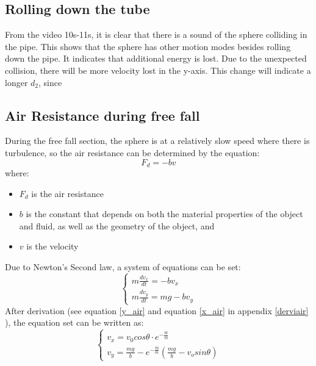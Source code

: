 \documentclass{article}
\begin{document}
        
    \subsection{Rolling down the tube}
    From the video \cite{youtube} 10s-11s, it is clear that there is a sound of the sphere colliding in the pipe. This shows that the sphere has other motion modes besides rolling down the pipe. It indicates that additional energy is lost. Due to the unexpected collision, there will be more velocity lost in the y-axis. This change will indicate a longer $d_2$, since
    \subsection{Air Resistance during free fall}
        During the free fall section, the sphere is at a relatively slow speed where there is turbulence, so the air resistance can be determined by the equation:
        \begin{equation}
            F_d = -bv
        \end{equation}
        where:
        \begin{itemize}
            \item $F_d$ is the air resistance
            \item $b$ is the constant that depends on both the material properties of the object and fluid, as well as the geometry of the object, and
            \item $v$ is the velocity
        \end{itemize}
        Due to Newton's Second law, a system of equations can be set:
        \begin{equation*}
            \begin{cases}
            m\frac{dv_x}{dt} = -bv_x\\
            m\frac{dv_y}{dt} = mg-bv_y
            \end{cases}
        \end{equation*}
        After derivation (see equation \ref{y_air} and equation \ref{x_air} in appendix \ref{derviair} ), the equation set can be written as:
        \begin{equation*}
            \begin{cases}
            v_x = v_0cos\theta\cdot e^{-\frac{bt}{m}}\\
            v_y = \frac{mg}{b} - e^{-\frac{tb}{m}}(\frac{mg}{b}-v_osin\theta)
            \end{cases}
        \end{equation*}
\end{document}
